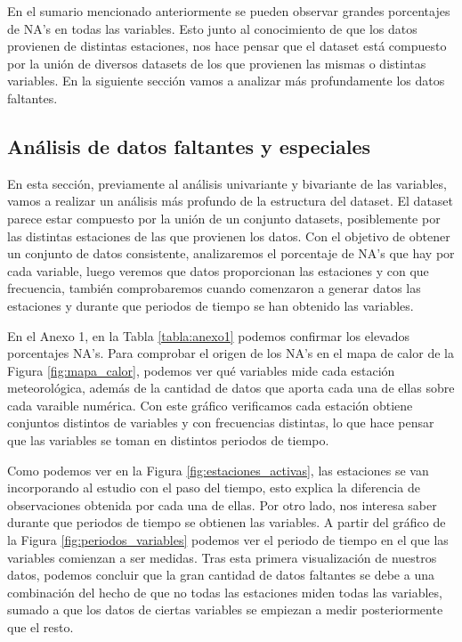 \documentclass[notspecified,article,submit,moreauthors,pdftex]{Definitions/mdpi}
\begin{document}
En el sumario mencionado anteriormente se pueden observar grandes
porcentajes de NA's en todas las variables. Esto junto al conocimiento
de que los datos provienen de distintas estaciones, nos hace pensar que
el dataset está compuesto por la unión de diversos datasets de los que
provienen las mismas o distintas variables. En la siguiente sección
vamos a analizar más profundamente los datos faltantes.

\hypertarget{anuxe1lisis-de-datos-faltantes-y-especiales}{%
\subsection{Análisis de datos faltantes y
especiales}\label{anuxe1lisis-de-datos-faltantes-y-especiales}}

En esta sección, previamente al análisis univariante y bivariante de las
variables, vamos a realizar un análisis más profundo de la estructura
del dataset. El dataset parece estar compuesto por la unión de un
conjunto datasets, posiblemente por las distintas estaciones de las que
provienen los datos. Con el objetivo de obtener un conjunto de datos
consistente, analizaremos el porcentaje de NA's que hay por cada
variable, luego veremos que datos proporcionan las estaciones y con que
frecuencia, también comprobaremos cuando comenzaron a generar datos las
estaciones y durante que periodos de tiempo se han obtenido las
variables.

En el Anexo 1, en la Tabla \ref{tabla:anexo1} podemos confirmar los
elevados porcentajes NA's. Para comprobar el origen de los NA's en el
mapa de calor de la Figura \ref{fig:mapa_calor}, podemos ver qué
variables mide cada estación meteorológica, además de la cantidad de
datos que aporta cada una de ellas sobre cada varaible numérica. Con
este gráfico verificamos cada estación obtiene conjuntos distintos de
variables y con frecuencias distintas, lo que hace pensar que las
variables se toman en distintos periodos de tiempo.

Como podemos ver en la Figura \ref{fig:estaciones_activas}, las
estaciones se van incorporando al estudio con el paso del tiempo, esto
explica la diferencia de observaciones obtenida por cada una de ellas.
Por otro lado, nos interesa saber durante que periodos de tiempo se
obtienen las variables. A partir del gráfico de la Figura
\ref{fig:periodos_variables} podemos ver el periodo de tiempo en el que
las variables comienzan a ser medidas. Tras esta primera visualización
de nuestros datos, podemos concluir que la gran cantidad de datos
faltantes se debe a una combinación del hecho de que no todas las
estaciones miden todas las variables, sumado a que los datos de ciertas
variables se empiezan a medir posteriormente que el resto.
\end{document}
